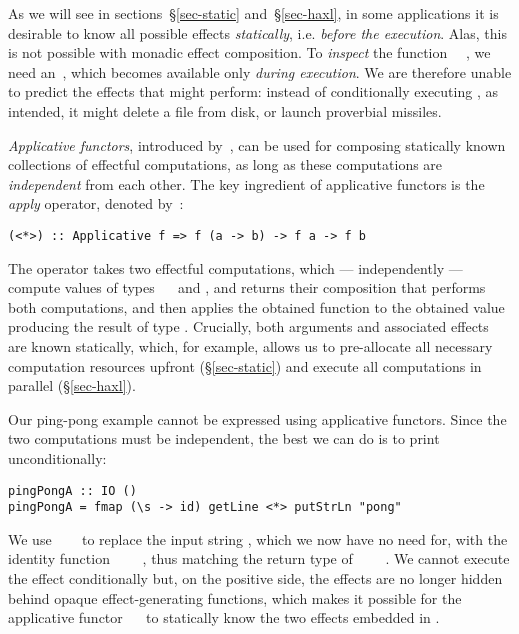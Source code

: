 As we will see in sections~\S\ref{sec-static} and~\S\ref{sec-haxl}, in some
applications it is desirable to know all possible effects \emph{statically},
i.e. \emph{before the execution}. Alas, this is not possible with monadic effect
composition. To \emph{inspect} the function \hs{\s}~\hs{->}~, we need
an~, which becomes available only \emph{during execution}. We are
therefore unable to predict the effects that  might perform:
instead of conditionally executing , as intended, it might delete a
file from disk, or launch proverbial missiles.

\emph{Applicative functors}, introduced by~\citet{mcbride2008applicative}, can
be used for composing statically known collections of effectful computations, as
long as these computations are \emph{independent} from each other. The key
ingredient of applicative functors is the \emph{apply} operator, denoted
by~\hs{<*>}:

\vspace{1mm}
\begin{verbatim}
(<*>) :: Applicative f => f (a -> b) -> f a -> f b
\end{verbatim}
\vspace{1mm}
\newpage

\noindent
The operator takes two effectful computations, which --- independently ---
compute values of types ~\hs{->}~ and , and returns their
composition that performs both computations, and then applies the obtained
function to the obtained value producing the result of type . Crucially,
both arguments and associated effects are known statically, which, for example,
allows us to pre-allocate all necessary computation resources upfront
(\S\ref{sec-static}) and execute all computations in parallel
(\S\ref{sec-haxl}).

Our ping-pong example cannot be expressed using applicative functors. Since the
two computations must be independent, the best we can do is to print 
unconditionally:

\vspace{0.5mm}
\begin{verbatim}
pingPongA :: IO ()
pingPongA = fmap (\s -> id) getLine <*> putStrLn "pong"
\end{verbatim}
\vspace{0.5mm}

\noindent
We use ~\hs{(\s}~\hs{->}~ to replace the input string ,
which we now have no need for, with the identity function
~\hs{::}~\hs{()}~\hs{->}~\hs{()}, thus matching the return type of
~~\hs{::}~~\hs{()}. We cannot execute the
 effect conditionally but, on the positive side, the effects are no
longer hidden behind opaque effect-generating functions, which makes it possible
for the applicative functor ~\hs{=}~ to statically know the two
effects embedded in .

